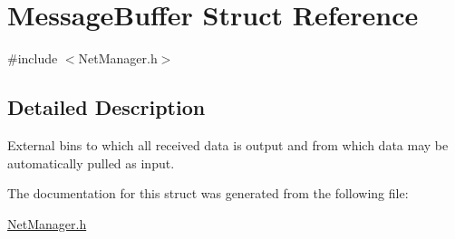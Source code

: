\hypertarget{structMessageBuffer}{\section{Message\-Buffer Struct Reference}
\label{structMessageBuffer}
}


{\ttfamily \#include $<$Net\-Manager.\-h$>$}



\subsection{Detailed Description}
External bins to which all received data is output and from which data may be automatically pulled as input. 

The documentation for this struct was generated from the following file\-:\begin{DoxyCompactItemize}
\item 
\hyperlink{NetManager_8h}{Net\-Manager.\-h}\end{DoxyCompactItemize}
